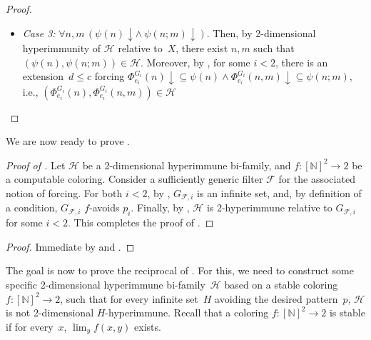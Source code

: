 \documentclass{article}
\def\F{\mathcal{F}}
\def\Hc{\mathcal{H}}
\newcommand{\RT}[0]{\mathsf{RT}}
\newcommand{\NN}[0]{\mathbb{N}}
\def\NN{\mathbb{N}}
\def\F{\mathcal{F}}
\def\Hc{\mathcal{H}}
\numberwithin{theorem}{section}
\theoremstyle{definition}
\newtheorem{corollary}[theorem]{Corollary}
\begin{document}
\begin{proof}
\begin{itemize}
        \item \emph{Case 3:} $\forall n,m \, (\psi(n) \downarrow \land\ \psi(n;m) \downarrow)$. Then, by 2-dimensional hyperimmunity of $\Hc$ relative to~$X$, there exist $n,m$ such that $(\psi(n),\psi(n;m)) \in \Hc$.  Moreover, by , for some $i<2$, there is an extension~$d \leq c$ forcing $\Phi_{e_i}^{G_i}(n) \downarrow \subseteq \psi(n) \land \Phi_{e_i}^{G_i}(n,m)\downarrow \subseteq \psi(n;m)$, i.e., $(\Phi_{e_i}^{G_i}(n), \Phi_{e_i}^{G_i}(n,m)) \in \Hc$

    \end{itemize}
\end{proof}

We are now ready to prove .

\begin{proof}[Proof of ]
Let $\Hc$ be a 2-dimensional hyperimmune bi-family, and $f : [\NN]^2 \to 2$ be a computable coloring.
Consider a sufficiently generic filter $\F$ for the associated notion of forcing. For both $i<2$, by ,  $G_{\F,i}$ is an infinite set, and, by definition of a condition, $G_{\F,i}$ $f$-avoids $p_i$. Finally, by , $\Hc$ is $2$-hyperimmune relative to $G_{\F,i}$ for some $i<2$.
This completes the proof of .
\end{proof}


\begin{proof}
Immediate by  and .
\end{proof}

The goal is now to prove the reciprocal of . For this, we need to construct some specific 2-dimensional hyperimmune bi-family~$\Hc$ based on a stable coloring $f : [\NN]^2 \to 2$, such that for every infinite set~$H$ avoiding the desired pattern~$p$, $\Hc$ is not 2-dimensional $H$-hyperimmune. Recall that a coloring $f : [\NN]^2 \to 2$ is stable if for every~$x$, $\lim_y f(x, y)$ exists.
\end{document}
